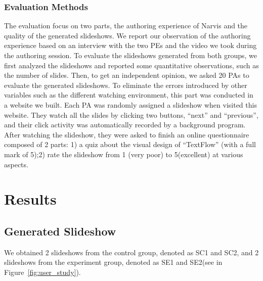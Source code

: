 \subsubsection{Evaluation Methods}
The evaluation focus on two parts, the authoring experience of Narvis and the quality of the generated slideshows. We report our observation of the authoring experience based on an interview with the two PEs and the video we took during the authoring session. 
To evaluate the slideshows generated from both groups, we first analyzed the slideshows and reported some quantitative observations, such as the number of slides.
Then, to get an independent opinion, we asked 20 PAs to evaluate the generated slideshows. To eliminate the errors introduced by other variables such as the different watching environment, this part was conducted in a website we built. Each PA was randomly assigned a slideshow when visited this website. They watch all the slides by clicking two buttons, ``next'' and ``previous'', and their click activity was automatically recorded by a background program.  After watching the slideshow, they were asked to finish an online questionnaire composed of 2 parts: 1) a quiz about the visual design of ``TextFlow'' (with a full mark of 5);2) rate the slideshow  from 1 (very poor) to 5(excellent) at various aspects. 

\section{Results}

\subsection{Generated Slideshow}
We obtained 2 slideshows from the control group, denoted as SC1 and SC2, and 2 slideshows from the experiment group, denoted as SE1 and SE2(see in Figure~\ref{fig:user_study}). 


